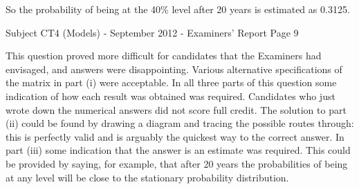 \documentclass[a4paper,12pt]{article}
\begin{document}
So the probability of being at the 40\% level after 20 years is estimated as 0.3125.

\newpage
Subject CT4 (Models) - September 2012 - Examiners' Report
Page 9

This question proved more difficult for candidates that the Examiners had envisaged, and
answers were disappointing. Various alternative specifications of the matrix in part (i) were
acceptable. In all three parts of this question some indication of how each result was
obtained was required. Candidates who just wrote down the numerical answers did not
score full credit. The solution to part (ii) could be found by drawing a diagram and tracing
the possible routes through: this is perfectly valid and is arguably the quickest way to the
correct answer. In part (iii) some indication that the answer is an estimate was required.
This could be provided by saying, for example, that after 20 years the probabilities of being
at any level will be close to the stationary probability distribution.
\end{document}

